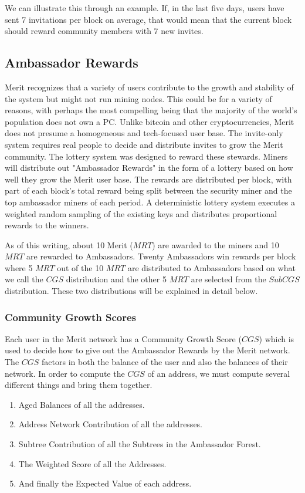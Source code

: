 \documentclass{article}
\begin{document}
We can illustrate this through an example.  If, in the last five days, users have sent 7 invitations
per block on average, that would mean that the current block should reward community members with 7 new invites.  

\subsection{Ambassador Rewards}

Merit recognizes that a variety of users contribute to the growth and stability
of the system but might not run mining nodes. This could be for a variety of reasons, with 
perhaps the most compelling being that the majority of the world's population does not own a PC.  Unlike bitcoin and other
cryptocurrencies, Merit does not presume a homogeneous and tech-focused user base. The invite-only
system requires real people to decide and distribute invites to grow the Merit community.
The lottery system was designed to reward these stewards. Miners will distribute
out "Ambassador Rewards" in the form of a lottery based on how well
they grow the Merit user base. The rewards are distributed per block, with part of each block's total 
reward being split between the security miner and the top ambassador miners of each period.  
A deterministic lottery system executes a weighted random sampling
of the existing keys and distributes proportional rewards to the winners.

As of this writing, about 10 Merit ($MRT$) are awarded to the miners and 10 $MRT$
are rewarded to Ambassadors. Twenty Ambassadors win rewards per block where 5 $MRT$
out of the 10 $MRT$ are distributed to Ambassadors based on what we call the 
$CGS$ distribution and the other 5 $MRT$ are selected from the $SubCGS$ distribution.
These two distributions will be explained in detail below.

\subsubsection{Community Growth Scores}

Each user in the Merit network has a Community Growth Score ($CGS$) which is
used to decide how to give out the Ambassador Rewards by the Merit network. 
The $CGS$ factors in both the balance of the user and also the balances of their
network. In order to compute the $CGS$ of an address, we must compute several 
different things and bring them together.

\begin{enumerate}
    \item Aged Balances of all the addresses.
    \item Address Network Contribution of all the addresses.
    \item Subtree Contribution of all the Subtrees in the Ambassador Forest.
    \item The Weighted Score of all the Addresses.
    \item And finally the Expected Value of each address.
\end{enumerate}
\end{document}
